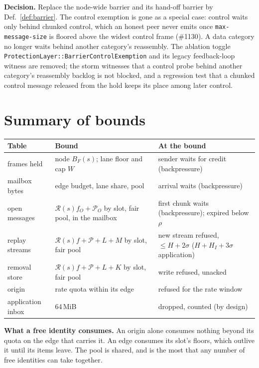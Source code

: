 \documentclass[journal]{IEEEtran}
\newcommand{\Rg}{\mathcal{R}}
\newcommand{\Pool}{\mathcal{P}}
\newcommand{\issue}[1]{\#{#1}}
\begin{document}
\textbf{Decision.}  Replace the node-wide barrier and its hand-off barrier by
Def.~\ref{def:barrier}.  The control exemption is gone as a special case: control waits only
behind chunked control, which an honest peer never emits once \texttt{max-message-size} is
floored above the widest control frame (\issue{1130}).  A data category no longer waits behind
another category's reassembly.  The ablation
toggle \texttt{ProtectionLayer::BarrierControlExemption} and its legacy feedback-loop witness
are removed; the storm witnesses that a control probe behind another category's reassembly
backlog is not blocked, and a regression test that a chunked control message released from
the hold keeps its place among later control.

\section{Summary of bounds}\label{sec:summary}

\begin{center}
\footnotesize
\begin{tabular}{@{}p{}p{}p{}@{}}
\toprule
Table & Bound & At the bound\\
\midrule
frames held & node $B_F(s)$; lane floor and cap $W$ & sender waits for credit (backpressure)\\
mailbox bytes & edge budget, lane share, pool & arrival waits (backpressure)\\
open messages & $\Rg(s) f_O+\Pool_O$ by slot, fair pool, in the mailbox & first chunk waits
(backpressure); expired below $\rho$\\
replay streams & $\Rg(s) f+\Pool+L+M$ by slot, fair pool & new stream refused, $\le H+2\sigma$
($H+H_I+3\sigma$ application)\\
removal store & $\Rg(s) f+\Pool+L+K$ by slot, fair pool & write refused, unacked\\
origin & rate quota within its edge & refused for the rate window\\
application inbox & 64\,MiB & dropped, counted (by design)\\
\bottomrule
\end{tabular}
\end{center}

\textbf{What a free identity consumes.}  An origin alone consumes nothing beyond its quota on the
edge that carries it.  An edge consumes its slot's floors, which outlive it until its items
leave.  The pool is shared, and is the most that any number of free identities can take
together.
\end{document}
